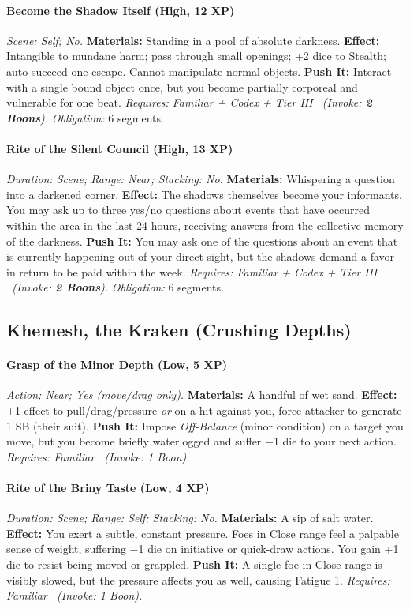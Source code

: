 \paragraph{Become the Shadow Itself (High, 12 XP)} \emph{Scene; Self; No.}
\textbf{Materials:} Standing in a pool of absolute darkness.
\textbf{Effect:} Intangible to mundane harm; pass through small openings; +2 dice to Stealth; auto-succeed one escape. Cannot manipulate normal objects.
\textbf{Push It:} Interact with a single bound object once, but you become partially corporeal and vulnerable for one beat.
\emph{Requires: Familiar + Codex + Tier III \ (\textit{Invoke:} \textbf{2 Boons}).}
\emph{Obligation:} 6 segments.

\paragraph{Rite of the Silent Council (High, 13 XP)} \emph{Duration: Scene; Range: Near; Stacking: No.}
\textbf{Materials:} Whispering a question into a darkened corner.
\textbf{Effect:} The shadows themselves become your informants. You may ask up to three yes/no questions about events that have occurred within the area in the last 24 hours, receiving answers from the collective memory of the darkness.
\textbf{Push It:} You may ask one of the questions about an event that is currently happening out of your direct sight, but the shadows demand a favor in return to be paid within the week.
\emph{Requires: Familiar + Codex + Tier III \ (\textit{Invoke:} \textbf{2 Boons}).}
\emph{Obligation:} 6 segments.

\subsection{Khemesh, the Kraken (Crushing Depths)}
\paragraph{Grasp of the Minor Depth (Low, 5 XP)} \emph{Action; Near; Yes (move/drag only).}
\textbf{Materials:} A handful of wet sand.
\textbf{Effect:} +1 effect to pull/drag/pressure \emph{or} on a hit against you, force attacker to generate 1 SB (their suit).
\textbf{Push It:} Impose \emph{Off-Balance} (minor condition) on a target you move, but you become briefly waterlogged and suffer −1 die to your next action.
\emph{Requires: Familiar \ (\textit{Invoke:} 1 Boon).}
\paragraph{Rite of the Briny Taste (Low, 4 XP)} \emph{Duration: Scene; Range: Self; Stacking: No.}
\textbf{Materials:} A sip of salt water.
\textbf{Effect:} You exert a subtle, constant pressure. Foes in Close range feel a palpable sense of weight, suffering −1 die on initiative or quick-draw actions. You gain +1 die to resist being moved or grappled.
\textbf{Push It:} A single foe in Close range is visibly slowed, but the pressure affects you as well, causing Fatigue 1.
\emph{Requires: Familiar \ (\textit{Invoke:} 1 Boon).}
